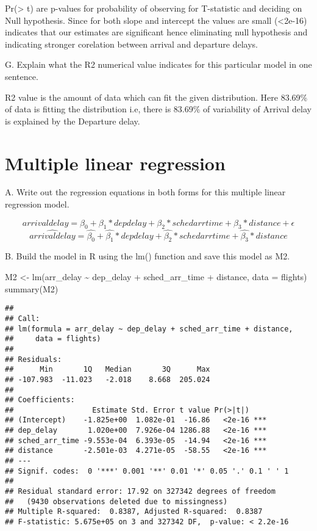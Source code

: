 \documentclass[
]{article}
\newenvironment{Shaded}{\begin{snugshade}}{\end{snugshade}}
\newcommand{\AttributeTok}[1]{\textcolor[rgb]{0.77,0.63,0.00}{#1}}
\newcommand{\FunctionTok}[1]{\textcolor[rgb]{0.00,0.00,0.00}{#1}}
\newcommand{\NormalTok}[1]{#1}
\newcommand{\OtherTok}[1]{\textcolor[rgb]{0.56,0.35,0.01}{#1}}
\newcommand{\SpecialCharTok}[1]{\textcolor[rgb]{0.00,0.00,0.00}{#1}}
\begin{document}
Pr(\textgreater{} \textbar t\textbar) are p-values for probability of
observing for T-statistic and deciding on Null hypothesis. Since for
both slope and intercept the values are small (\textless2e-16) indicates
that our estimates are significant hence eliminating null hypothesis and
indicating stronger corelation between arrival and departure delays.

G. Explain what the R2 numerical value indicates for this particular
model in one sentence.

R2 value is the amount of data which can fit the given distribution.
Here 83.69\% of data is fitting the distribution i.e, there is 83.69\%
of variability of Arrival delay is explained by the Departure delay.

\hypertarget{multiple-linear-regression}{%
\section{Multiple linear regression}\label{multiple-linear-regression}}

A. Write out the regression equations in both forms for this multiple
linear regression model.

\[
arrivaldelay = \beta_{0} + \beta_{1} * depdelay + \beta_{2} * schedarrtime + \beta_{3} * distance + \epsilon
\] \[
\hat{arrivaldelay} = \hat{\beta_{0}} + \hat{\beta_{1}} * depdelay + \hat{\beta_{2}} * schedarrtime + \hat{\beta_{3}} * distance
\]

B. Build the model in R using the lm() function and save this model as
M2.

\begin{Shaded}
\begin{Highlighting}[]
\NormalTok{M2 }\OtherTok{\textless{}{-}} \FunctionTok{lm}\NormalTok{(arr\_delay }\SpecialCharTok{\textasciitilde{}}\NormalTok{ dep\_delay }\SpecialCharTok{+}\NormalTok{ sched\_arr\_time }\SpecialCharTok{+}\NormalTok{ distance, }\AttributeTok{data =}\NormalTok{ flights)}
\FunctionTok{summary}\NormalTok{(M2)}
\end{Highlighting}
\end{Shaded}

\begin{verbatim}
## 
## Call:
## lm(formula = arr_delay ~ dep_delay + sched_arr_time + distance, 
##     data = flights)
## 
## Residuals:
##      Min       1Q   Median       3Q      Max 
## -107.983  -11.023   -2.018    8.668  205.024 
## 
## Coefficients:
##                  Estimate Std. Error t value Pr(>|t|)    
## (Intercept)    -1.825e+00  1.082e-01  -16.86   <2e-16 ***
## dep_delay       1.020e+00  7.926e-04 1286.88   <2e-16 ***
## sched_arr_time -9.553e-04  6.393e-05  -14.94   <2e-16 ***
## distance       -2.501e-03  4.271e-05  -58.55   <2e-16 ***
## ---
## Signif. codes:  0 '***' 0.001 '**' 0.01 '*' 0.05 '.' 0.1 ' ' 1
## 
## Residual standard error: 17.92 on 327342 degrees of freedom
##   (9430 observations deleted due to missingness)
## Multiple R-squared:  0.8387, Adjusted R-squared:  0.8387 
## F-statistic: 5.675e+05 on 3 and 327342 DF,  p-value: < 2.2e-16
\end{verbatim}
\end{document}
